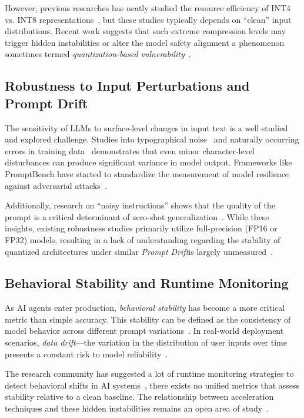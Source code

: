 \documentclass[conference]{IEEEtran}
\begin{document}
However, previous researches has neatly studied the resource efficiency of INT4 vs. INT8 representations~\cite{ref9, ref1}, but these studies typically depends on ``clean'' input distributions. Recent work suggests that such extreme compression levels may trigger hidden instabilities or alter the model safety alignment a phenomenon sometimes termed \textit{quantization-based vulnerability}~\cite{ref9}.

\subsection{Robustness to Input Perturbations and Prompt Drift}

The sensitivity of LLMs to surface-level changes in input text is a well studied and explored challenge. Studies into typographical noise~\cite{ref11} and naturally occurring errors in training data~\cite{ref8} demonstrates that even minor character-level disturbances can produce significant variance in model output. Frameworks like PromptBench have started to standardize the measurement of model resilience against adversarial attacks~\cite{ref5}. 

Additionally, research on ``noisy instructions'' shows that the quality of the prompt is a critical determinant of zero-shot generalization~\cite{ref10}. While these insights, existing robustness studies primarily utilize full-precision (FP16 or FP32) models, resulting in a lack of understanding regarding the stability of quantized architectures under similar \textit{Prompt Drift}is  largely unmeasured~\cite{ref4}.

\subsection{Behavioral Stability and Runtime Monitoring}

As AI agents enter production, \textit{behavioral stability} has become a more critical metric than simple accuracy. This stability can be defined as the consistency of model behavior across different prompt variations~\cite{ref6}. In real-world deployment scenarios, \textit{data drift}—the variation in the distribution of user inputs over time presents a constant risk to model reliability~\cite{ref7}. 

The research community has suggested a lot of runtime monitoring strategies to detect behavioral shifts in AI systems~\cite{ref12}, there exists no unified metrics that assess stability relative to a clean baseline. The relationship between acceleration techniques and these hidden instabilities remains an open area of study~\cite{ref9}.
\end{document}
